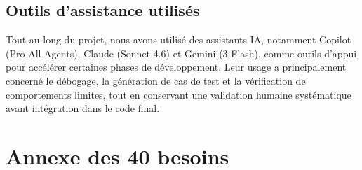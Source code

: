\documentclass[a4paper]{article}
\begin{document}
    \subsection{Outils d'assistance utilisés}
    Tout au long du projet, nous avons utilisé des assistants IA, notamment Copilot (Pro All Agents), Claude (Sonnet 4.6) et Gemini (3 Flash), comme outils d'appui pour accélérer certaines phases de développement. Leur usage a principalement concerné le débogage, la génération de cas de test et la vérification de comportements limites, tout en conservant une validation humaine systématique avant intégration dans le code final.


\nocite{*}



\clearpage
\appendix

\section{Annexe des 40 besoins}
\end{document}
